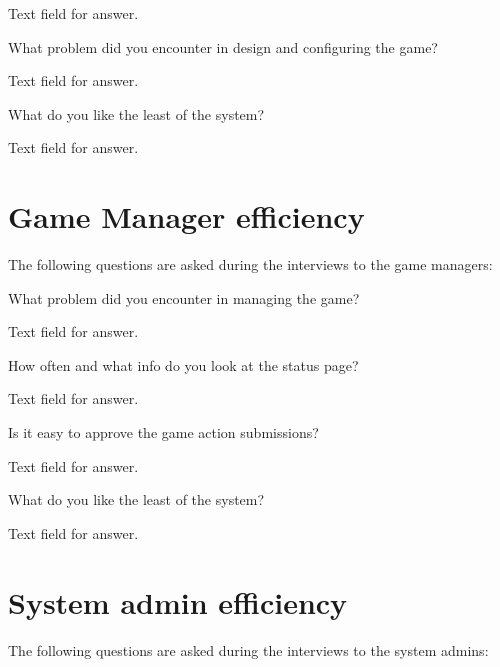 Text field for answer.

\begin{question}
    \item What problem did you encounter in design and configuring the game?
\end{question}

Text field for answer.

\begin{question}
    \item What do you like the least of the system?
\end{question}

Text field for answer.

\section{Game Manager efficiency}

The following questions are asked during the interviews to the game managers:

\begin{question}
	\item What problem did you encounter in managing the game?
\end{question}

Text field for answer.

\begin{question}
	\item How often and what info do you look at the status page?
\end{question}

Text field for answer.

\begin{question}
	\item Is it easy to approve the game action submissions?
\end{question}

Text field for answer.

\begin{question}
	\item What do you like the least of the system?
\end{question}

Text field for answer.

\section{System admin efficiency}

The following questions are asked during the interviews to the system admins:

